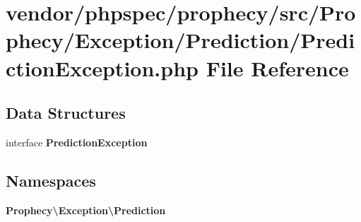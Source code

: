 \section{vendor/phpspec/prophecy/src/\+Prophecy/\+Exception/\+Prediction/\+Prediction\+Exception.php File Reference}
\label{_prediction_exception_8php}
\subsection*{Data Structures}
\begin{DoxyCompactItemize}
\item 
interface {\bf Prediction\+Exception}
\end{DoxyCompactItemize}
\subsection*{Namespaces}
\begin{DoxyCompactItemize}
\item 
 {\bf Prophecy\textbackslash{}\+Exception\textbackslash{}\+Prediction}
\end{DoxyCompactItemize}
